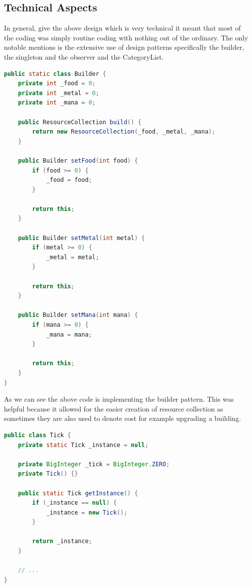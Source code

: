 \documentclass[12pt]{article}
\begin{document}
\subsection{Technical Aspects}

In general, give the above design which is very technical it
meant that most of the coding was simply routine coding with
nothing out of the ordinary. The only notable mentions is the
extensive use of design patterns specifically the builder, the
singleton and the observer and the CategoryList.


\begin{lstlisting}[language=Java, caption={Builder pattern used
for the ResourceCollection}]
public static class Builder {
    private int _food = 0;
    private int _metal = 0;
    private int _mana = 0;
    
    public ResourceCollection build() {
        return new ResourceCollection(_food, _metal, _mana);
    }
    
    public Builder setFood(int food) {
        if (food >= 0) {
            _food = food;
        }
    
        return this;
    }
    
    public Builder setMetal(int metal) {
        if (metal >= 0) {
            _metal = metal;
        }
    
        return this;
    }
    
    public Builder setMana(int mana) {
        if (mana >= 0) {
            _mana = mana;
        }
    
        return this;
    }
}
\end{lstlisting}

As we can see the above code is implementing the builder
pattern. This was helpful because it allowed for the easier
creation of resource collection as sometimes they are also used
to denote cost for example upgrading a building.

\begin{lstlisting}[language=Java, caption={The game Tick class
is a singleton}]
public class Tick {
    private static Tick _instance = null;

    private BigInteger _tick = BigInteger.ZERO;
    private Tick() {}

    public static Tick getInstance() {
        if (_instance == null) {
            _instance = new Tick();
        }

        return _instance;
    }

    // ...
}
\end{lstlisting}
\end{document}
